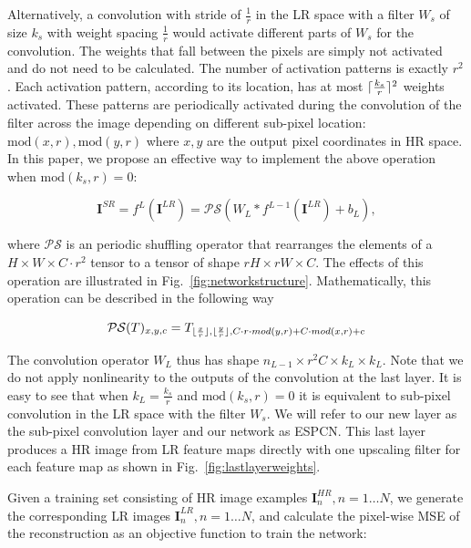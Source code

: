 \documentclass[10pt,twocolumn,letterpaper]{article}
\DeclarePairedDelimiter\ceil{\lceil}{\rceil}
\DeclarePairedDelimiter\floor{\lfloor}{\rfloor}
\newcommand{\Mod}[2]{\text{mod}\left(#1,#2\right)}
\newcommand{\lrimage}[0]{\mathbf{I}^{LR}}
\newcommand{\hrimage}[0]{\mathbf{I}^{HR}}
\newcommand{\networkoutput}[0]{\mathbf{I}^{SR}}
\newcommand{\convolution}[2]{#1\ast#2}
\newcommand{\periodicshufflingoperator}[0]{\mathcal{PS}}
\begin{document}
Alternatively, a convolution with stride of $\frac{1}{r}$ in the \ac{LR} space with a filter $W_s$ of size $k_s$ with weight spacing $\frac{1}{r}$ would activate different parts of $W_s$ for the convolution. The weights that fall between the pixels are simply not activated and do not need to be calculated. The number of activation patterns is exactly $r^2$. Each activation pattern, according to its location, has at most $\ceil{\frac{k_s}{r}}^2$ weights activated. These patterns are periodically activated during the convolution of the filter across the image depending on different sub-pixel location: $\Mod{x}{r},\Mod{y}{r}$ where $x, y$ are the output pixel coordinates in \ac{HR} space. In this paper, we propose an effective way to implement the above operation when $\Mod{k_s}{r} = 0$:

\begin{equation}
\networkoutput = f^L(\lrimage) = \periodicshufflingoperator\left ( \convolution{W_L}{f^{L-1}(\lrimage)+b_{L}} \right),
\label{eq:reconstruction}
\end{equation}

where $\periodicshufflingoperator$ is an periodic shuffling operator that rearranges the elements of a $H \times W \times C\cdot r^2$ tensor to a tensor of shape $rH \times rW \times C$. The effects of this operation are illustrated in Fig.~\ref{fig:networkstructure}. Mathematically, this operation can be described in the following way

\begin{equation}
	\periodicshufflingoperator(T)_{x,y,c} = T_{\floor{\nicefrac{x}{r}},\floor{\nicefrac{y}{r}},C \cdot r \cdot mod(y,r) + C \cdot mod(x,r) + c}
	\label{eq:p-shuffling-operator}
\end{equation}

The convolution operator $W_L$ thus has shape $n_{L-1} \times r^2C \times k_L \times k_L$. Note that we do not apply nonlinearity to the outputs of the convolution at the last layer. It is easy to see that when $k_L = \frac{k_s}{r}$ and $\Mod{k_s}{r} = 0$ it is equivalent to sub-pixel convolution in the \ac{LR} space with the filter $W_s$. We will refer to our new layer as the sub-pixel convolution layer and our network as \ac{ESPCN}. This last layer produces a \ac{HR} image from \ac{LR} feature maps directly with one upscaling filter for each feature map as shown in Fig.~\ref{fig:lastlayerweights}.

Given a training set consisting of \ac{HR} image examples $\hrimage_{n},n=1\ldots N$, we generate the corresponding \ac{LR} images $\lrimage_{n},n=1\ldots N$, and calculate the pixel-wise \ac{MSE} of the reconstruction as an objective function to train the network:
\end{document}
